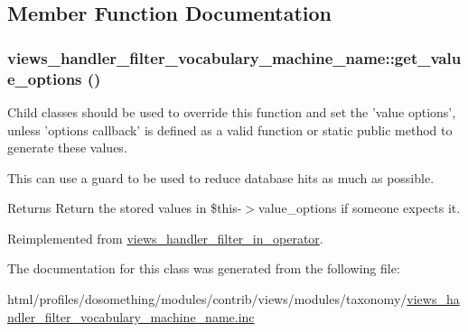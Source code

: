 \subsection{Member Function Documentation}
\hypertarget{classviews__handler__filter__vocabulary__machine__name_a908ca2aa5491d15ab2e0e85cefe62dab}{
\subsubsection[{get\_\-value\_\-options}]{\setlength{\rightskip}{0pt plus 5cm}views\_\-handler\_\-filter\_\-vocabulary\_\-machine\_\-name::get\_\-value\_\-options ()}}
\label{classviews__handler__filter__vocabulary__machine__name_a908ca2aa5491d15ab2e0e85cefe62dab}
Child classes should be used to override this function and set the 'value options', unless 'options callback' is defined as a valid function or static public method to generate these values.

This can use a guard to be used to reduce database hits as much as possible.

\begin{DoxyReturn}{Returns}
Return the stored values in \$this-\/$>$value\_\-options if someone expects it. 
\end{DoxyReturn}


Reimplemented from \hyperlink{classviews__handler__filter__in__operator_aa5b5df6d90f4359ed28c0c446bdc81a6}{views\_\-handler\_\-filter\_\-in\_\-operator}.

The documentation for this class was generated from the following file:\begin{DoxyCompactItemize}
\item 
html/profiles/dosomething/modules/contrib/views/modules/taxonomy/\hyperlink{views__handler__filter__vocabulary__machine__name_8inc}{views\_\-handler\_\-filter\_\-vocabulary\_\-machine\_\-name.inc}\end{DoxyCompactItemize}
